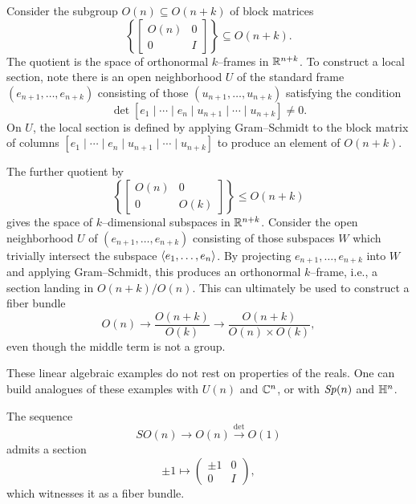 \begin{example}
Consider the subgroup $O(n) \subseteq O(n+k)$ of block matrices \[\left\{\left[\begin{array}{c|c} O(n) & 0 \\ \hline 0 & I \end{array} \right]\right\} \subseteq O(n+k).\]
The quotient is the space of orthonormal $k$--frames in $\mathbb R^{n+k}$.
To construct a local section, note there is an open neighborhood $U$ of the standard frame $(e_{n+1}, \ldots, e_{n+k})$ consisting of those $(u_{n+1}, \ldots, u_{n+k})$ satisfying the condition \[\det\left[e_1 \mid \cdots \mid e_n \mid u_{n+1} \mid \cdots \mid u_{n+k}\right] \ne 0.\]
On $U$, the local section is defined by applying Gram--Schmidt to the block matrix of columns $[e_1 \mid \cdots \mid e_n \mid u_{n+1} \mid \cdots \mid u_{n+k}]$ to produce an element of $O(n+k)$.
\end{example}

\begin{example}[Grassmannians]\label{GrassmanniansAreFiberBundles}%
The further quotient by \[\left\{ \left[ \begin{array}{c|c} O(n) & 0 \\ \hline 0 & O(k) \end{array} \right] \right\} \le O(n+k)\] gives the space of $k$--dimensional subspaces in $\mathbb R^{n+k}$.
Consider the open neighborhood $U$ of $(e_{n+1}, \ldots, e_{n+k})$ consisting of those subspaces $W$ which trivially intersect the subspace $\langle e_1, \ldots, e_n\rangle$.
By projecting $e_{n+1}, \ldots, e_{n+k}$ into $W$ and applying Gram--Schmidt, this produces an orthonormal $k$--frame, i.e., a section landing in $O(n+k) / O(n)$.
This can ultimately be used to construct a fiber bundle \[O(n) \to \frac{O(n+k)}{O(k)} \to \frac{O(n+k)}{O(n) \times O(k)},\] even though the middle term is not a group.
\end{example}

\begin{example}
These linear algebraic examples do not rest on properties of the reals.
One can build analogues of these examples with $U(n)$ and $\mathbb C^n$, or with $\mathit{Sp}(n)$ and $\mathbb H^n$.
\end{example}

\begin{example}\label{SOtoOisAFiberBundle}%
The sequence \[SO(n) \to O(n) \xrightarrow{\det} O(1)\] admits a section \[\pm 1 \mapsto \left( \begin{array}{c|c} \pm 1 & 0 \\ 0 & I \end{array} \right),\] which witnesses it as a fiber bundle.
\end{example}

